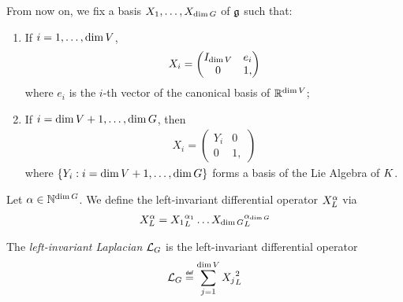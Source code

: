From now on, we fix a basis $X_1, \dots, X_{\dim G}$ of $\mathfrak{g}$ such that:
\begin{enumerate}
    \item If $i = 1, \dots, \dim V$,
        \begin{align*}
            X_i =
                \begin{pmatrix}
                    {I_{\dim V}} & e_i\\
                    0 & 1,
                \end{pmatrix}
        \end{align*}
        where $e_i$ is the $i$-th vector of the canonical basis of $\mathbb{R}^{\dim V}$;
    \item If $i = \dim V + 1, \dots, \dim G$, then
        \begin{align}
            X_i =
                \begin{pmatrix}
                    Y_i & 0\\
                    0 & 1,
                \end{pmatrix}
                \label{eq:Lie_algebra_vector_coming_from_compact_group}
        \end{align}
        where $\{Y_i : i = \dim V + 1, \dots, \dim G\}$ forms a basis of the Lie Algebra of $K$.
\end{enumerate}

\begin{definition}
    Let $\alpha \in \mathbb{N}^{\dim G}$.
    We define the left-invariant differential operator $X^{\alpha}_L$ via
    \begin{align*}
        X^{\alpha}_L =
        {X_1}_L^{\alpha_1} \dots
        {X_{\dim G}}_L^{\alpha_{\dim G}}
    \end{align*}
\end{definition}

\begin{definition}
\label{definition:left-invariant_Laplacian}
    The \emph{left-invariant Laplacian} ${\mathcal{L}_{G}}$ is the left-invariant differential operator
    \begin{align*}
        \Laplacian \defeq \sum_{j = 1}^{\dim \VectorSpace} \LeftDifferentialOperatorFirstOrder{X_j}^2
    \end{align*}
\end{definition}

